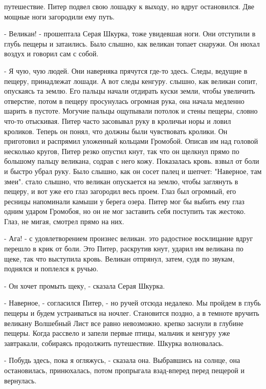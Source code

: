 путешествие. Питер подвел свою лошадку к выходу, но вдруг остановился. 
Две мощные ноги загородили ему путь.
\par- Великан! - прошептала Серая Шкурка, тоже увидевшая ноги. Они 
отступили в глубь пещеры и затаились. Было слышно, как великан топает 
снаружи. Он нюхал воздух и говорил сам с собой.
\par- Я чую, чую людей. Они наверняка прячутся где-то здесь. Следы, 
ведущие в пещеру, принадлежат лошади. А вот следы кенгуру.
 слышно, как великан сопит, опускаясь та землю. Его пальцы 
начали отдирать куски земли, чтобы увеличить отверстие, потом в пещеру 
просунулась огромная рука, она начала медленно шарить в пустоте. 
Могучие пальцы ощупывали потолок и стены пещеры, словно что-то 
отыскивая.
 Питер часто засовывал руку в кроличьи норы и ловил 
кроликов. Теперь он понял, что должны были чувствовать кролики. Он 
приготовил и распрямил уложенный кольцами Громобой. Описав им над 
головой несколько кругов, Питер резко опустил кнут, так что он щелкнул 
прямо по большому пальцу великана, содрав с него кожу. Показалась 
кровь.
 взвыл от боли и быстро убрал руку. Было слышно, как он 
сосет палец и шепчет: "Наверное, там змеи".
 стало слышно, что великан опускается на землю, чтобы 
заглянуть в пещеру, и вот уже его глаз загородил весь проем. Глаз был 
огромный, его ресницы напоминали камыши у берега озера. Питер мог бы 
выбить ему глаз одним ударом Громобоя, но он не мог заставить себя 
поступить так жестоко. Глаз, не мигая, смотрел прямо на них.
\par- Ага! - с удовлетворением произнес великан.
 это радостное восклицание вдруг перешло в крик от боли. Это 
Питер, раскрутив кнут, ударил им великана по щеке, так что выступила 
кровь. Великан отпрянул, затем, судя по звукам, поднялся и поплелся к 
ручью.
\par- Он хочет промыть щеку, - сказала Серая Шкурка.
\par- Наверное, - согласился Питер, - но ручей отсюда недалеко. Мы 
пройдем в глубь пещеры и будем устраиваться на ночлег. Становится 
поздно, а в темноте вручить великану Волшебный Лист все равно 
невозможно.
 крепко заснули в глубине пещеры. Когда рассвело и запели 
первые птицы, мальчик и кенгуру уже завтракали, собираясь продолжить 
путешествие.
 Шкурка волновалась.
\par- Побудь здесь, пока я огляжусь, - сказала она. Выбравшись на 
солнце, она остановилась, принюхалась, потом пропрыгала взад-вперед 
перед пещерой и вернулась.
